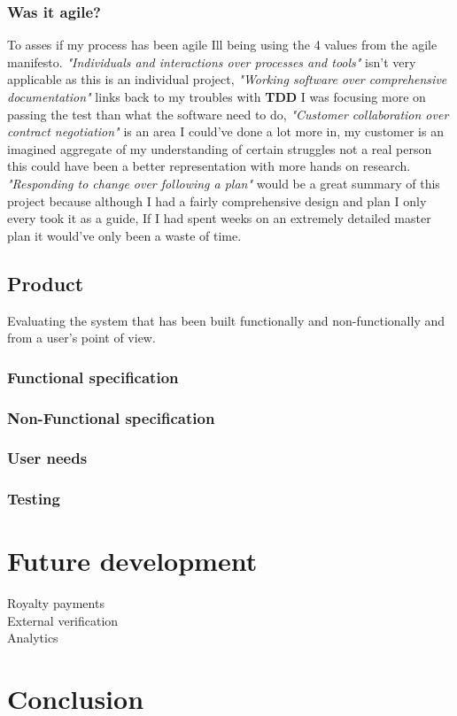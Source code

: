 \documentclass[12pt]{article}
\begin{document}
\subsubsection{Was it agile?}

To asses if my process has been agile Ill being using the 4 values from the agile manifesto\cite{agile}. \textit{"Individuals and interactions over processes and tools"} isn't very applicable as this is an individual project, \textit{"Working software over comprehensive documentation"} links back to my troubles with \textbf{TDD} I was focusing more on passing the test than what the software need to do, \textit{"Customer collaboration over contract negotiation"} is an area I could've done a lot more in, my customer is an imagined aggregate of my understanding of certain struggles not a real person this could have been a better representation with more hands on research. \textit{"Responding to change over following a plan"} would be a great summary of this project because although I had a fairly comprehensive design and plan I only every took it as a guide, If I had spent weeks on an extremely detailed master plan it would've only been a waste of time.

\subsection{Product}
Evaluating the system that has been built functionally and non-functionally and from a user's point of view.


\subsubsection{Functional specification}
\subsubsection{Non-Functional specification}
\subsubsection{User needs}

\subsubsection{Testing}

\section{Future development}

\begin{description}
	\item[Royalty payments]
	\item[External verification]
	\item[Analytics]
\end{description}

\section{Conclusion}





\end{document}
